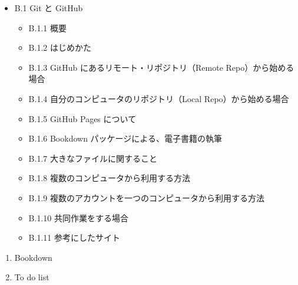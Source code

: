 \documentclass[
  xelatex, ja=standard]{bxjsbook}
\providecommand{\tightlist}{%
  \setlength{\itemsep}{0pt}\setlength{\parskip}{0pt}}
\theoremstyle{definition}
\theoremstyle{definition}
\theoremstyle{definition}
\theoremstyle{definition}
\theoremstyle{remark}
\begin{document}
\begin{itemize}
\tightlist
\item
  B.1 Git と GitHub

  \begin{itemize}
  \tightlist
  \item
    B.1.1 概要
  \item
    B.1.2 はじめかた
  \item
    B.1.3 GitHub にあるリモート・リポジトリ（Remote Repo）から始める場合
  \item
    B.1.4 自分のコンピュータのリポジトリ（Local Repo）から始める場合
  \item
    B.1.5 GitHub Pages について
  \item
    B.1.6 Bookdown パッケージによる、電子書籍の執筆
  \item
    B.1.7 大きなファイルに関すること
  \item
    B.1.8 複数のコンピュータから利用する方法
  \item
    B.1.9 複数のアカウントを一つのコンピュータから利用する方法
  \item
    B.1.10 共同作業をする場合
  \item
    B.1.11 参考にしたサイト
  \end{itemize}
\end{itemize}

\begin{enumerate}
\def\labelenumi{\arabic{enumi}.}
\setcounter{enumi}{89}
\tightlist
\item
  Bookdown
\item
  To do list
\end{enumerate}

\renewcommand\bibname{参考文献}
  
\end{document}
